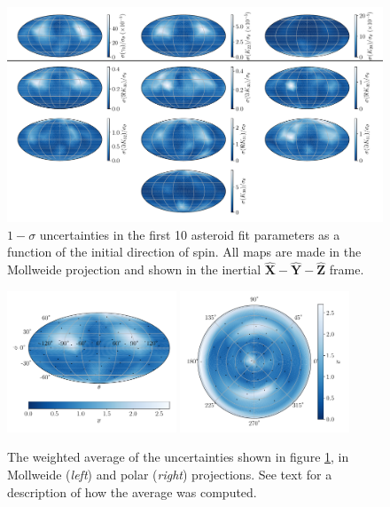 \documentclass{aastex631}
\newcommand{\unit}[1]{\hat{\bm{#1}}}
\begin{document}
\begin{figure}
  \centering
  \includegraphics[width=\textwidth]{spin-pole.pdf}
  \caption{$1-\sigma$ uncertainties in the first 10 asteroid fit parameters as a function of the initial direction of spin. All maps are made in the Mollweide projection and shown in the inertial $\unit X-\unit Y-\unit Z$ frame.}
  \label{fig:spin-pole}
\end{figure}
\begin{figure}
  \centering
  \includegraphics[width=0.45\textwidth]{spin-pole-avg-mollweide.pdf}
  \includegraphics[width=0.45\textwidth]{spin-pole-avg-polar.pdf}
  \caption{The weighted average of the uncertainties shown in figure \ref{fig:spin-pole}, in Mollweide (\textit{left}) and polar (\textit{right}) projections. See text for a description of how the average was computed.}
  \label{fig:spin-pole-avg}
\end{figure}
\end{document}
